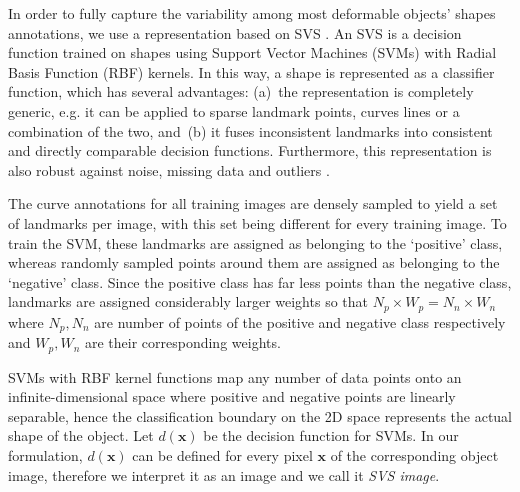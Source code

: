 In order to fully capture the variability among most deformable objects' shapes annotations, we use a representation based on SVS \cite{Nguyen2013}. An SVS is a decision function trained on shapes using Support Vector Machines (SVMs) with Radial Basis Function (RBF) kernels. In this way, a shape is represented as a classifier function, which has several advantages: (a)~the representation is completely generic, e.g. it can be applied to sparse landmark points, curves lines or a combination of the two, and~(b) it fuses inconsistent landmarks into consistent and directly comparable decision functions. Furthermore, this representation is also robust against noise, missing data and outliers \cite{Nguyen2013}.

The curve annotations for all training images are densely sampled to yield a set of landmarks per image, with this set being different for every training image. To train the SVM, these landmarks are assigned as belonging to the `positive' class, whereas randomly sampled points around them are assigned as belonging to the `negative' class. Since the positive class has far less points than the negative class, landmarks are assigned considerably larger weights so that $N_p \times W_p=N_n \times W_n$ where $N_p, N_n$ are number of points of the positive and negative class respectively and $W_p, W_n$ are their corresponding weights.

SVMs with RBF kernel functions map any number of data points onto an infinite-dimensional space where positive and negative points are linearly separable, hence the classification boundary on the 2D space represents the actual shape of the object.
Let $d(\bm{x})$ be the decision function for SVMs. In our formulation, $d(\bm{x})$ can be defined for every pixel $\bm{x}$ of the corresponding object image, therefore we interpret it as an image and we call it \emph{SVS image}.



